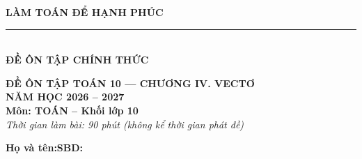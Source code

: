 \documentclass[10pt,a4paper]{article}
\begin{document}
\noindent
\begin{minipage}[c]{0.38\textwidth}
    \centering
    \textbf{LÀM TOÁN ĐỂ HẠNH PHÚC}\\[-2pt]
    \rule{3.2cm}{0.6pt}\\[2pt]
    \textbf{ĐỀ ÔN TẬP CHÍNH THỨC}
\end{minipage}\hfill
\begin{minipage}[c]{0.52\textwidth}
    \centering
    \textbf{ĐỀ ÔN TẬP TOÁN 10 — CHƯƠNG IV. VECTƠ}\\[1pt]
    \textbf{NĂM HỌC 2026 -- 2027}\\[1pt]
    \textbf{Môn: TOÁN -- Khối lớp 10}\\
    \textit{\small Thời gian làm bài: 90 phút (không kể thời gian phát đề)}
\end{minipage}

\vspace{0.05cm}
\noindent
\begin{minipage}[b]{0.78\textwidth}
    \textbf{Họ và tên:}\dotfill\textbf{SBD:}\makebox[3.5cm]{\dotfill}
\end{minipage}\hfill
\begin{minipage}[b]{0.20\textwidth}
    \hfill
    \setlength{\fboxrule}{0.8pt}%
\end{minipage}
\vspace{0.05cm}
\end{document}
